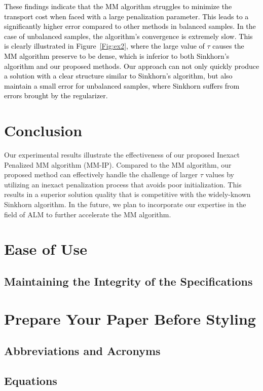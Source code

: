 \documentclass[conference]{IEEEtran}
\newcommand{\changeSX}[1]{\textcolor{black}{#1}}
\begin{document}
\changeSX{These findings indicate that the MM algorithm struggles to minimize the transport cost when faced with a large penalization parameter. This leads to a significantly higher error compared to other methods in balanced samples. In the case of unbalanced samples, the algorithm's convergence is extremely slow. This is clearly illustrated in Figure~\ref{Fig:ex2}, where the large value of $\tau$ causes the MM algorithm preserve to be dense, which is inferior to both Sinkhorn's algorithm and our proposed methods. Our approach can not only quickly produce a solution with a clear structure similar to Sinkhorn's algorithm, but also maintain a small error for unbalanced samples, where Sinkhorn suffers from errors brought by the regularizer.}



\section{Conclusion}
Our experimental results illustrate the effectiveness of our proposed Inexact Penalized MM algorithm (MM-IP). Compared to the MM algorithm, our proposed method can effectively handle the challenge of larger $\tau$ values by utilizing an inexact penalization process that avoids poor initialization. This results in a superior solution quality that is competitive with the widely-known Sinkhorn algorithm. In the future, we plan to incorporate our expertise in the field of ALM to further accelerate the MM algorithm.




\section{Ease of Use}

\subsection{Maintaining the Integrity of the Specifications}


\section{Prepare Your Paper Before Styling}


\subsection{Abbreviations and Acronyms}\label{AA}


\subsection{Equations}
\end{document}
